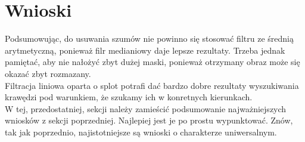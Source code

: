 \documentclass{classrep}
\begin{document}
\section{Wnioski}
\noindent
Podsumowując, do usuwania szumów nie powinno się stosować filtru ze średnią arytmetyczną, ponieważ filr medianiowy daje lepsze rezultaty. Trzeba jednak pamiętać, aby nie nałożyć zbyt dużej maski, ponieważ otrzymany obraz może się okazać zbyt rozmazany.\\
Filtracja liniowa oparta o splot potrafi dać bardzo dobre rezultaty wyszukiwania krawędzi pod warunkiem, że szukamy ich w konretnych kierunkach.\\
{\color{blue}W tej, przedostatniej, sekcji należy zamieścić podsumowanie
najważniejszych wniosków z sekcji poprzedniej. Najlepiej jest je po prostu
wypunktować. Znów, tak jak poprzednio, najistotniejsze są wnioski o
charakterze uniwersalnym.}


\begin{thebibliography}{1}
\\



\end{thebibliography}
\end{document}
